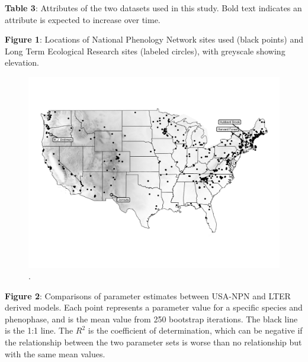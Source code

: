 \documentclass[fleqn,12pt,lineno]{article}
\begin{document}
\textbf{Table 3}: Attributes of the two datasets used in this study. Bold text indicates an attribute is expected to increase over time.



\newpage

\textbf{Figure 1}: Locations of National Phenology Network sites used (black points) and Long Term Ecological Research sites (labeled circles), with greyscale showing elevation.

\newpage

\begin{figure}[H]
	\centering
	\includegraphics[scale=0.6, angle=90]{figure_site_map.png}
	\caption{.}
\end{figure}


\newpage

\textbf{Figure 2}: Comparisons of parameter estimates between USA-NPN and LTER derived models. Each point represents a parameter value for a specific species and phenophase, and is the mean value from 250 bootstrap iterations. The black line is the 1:1 line. The $R^2$ is the coefficient of determination, which can be negative if the relationship between the two parameter sets is worse than no relationship but with the same mean values.

\newpage
\end{document}
